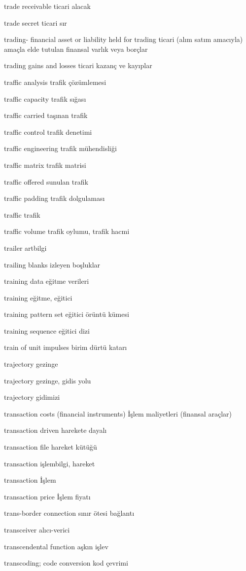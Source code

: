 \documentclass[12pt,fleqn]{article}\usepackage{../../common}
\begin{document}
trade receivable ticari alacak

trade secret ticari sır

trading- financial asset or liability held for trading ticari (alım satım amacıyla) amaçla elde tutulan finansal varlık veya borçlar

trading gains and losses ticari kazanç ve kayıplar

traffic analysis trafik çözümlemesi

traffic capacity trafik sığası

traffic carried taşınan trafik

traffic control trafik denetimi

traffic engineering trafik mühendisliği

traffic matrix trafik matrisi

traffic offered sunulan trafik

traffic padding trafik dolgulaması

traffic trafik

traffic volume trafik oylumu, trafik hacmi

trailer artbilgi

trailing blanks izleyen boşluklar

training data eğitme verileri

training eğitme, eğitici

training pattern set eğitici örüntü kümesi

training sequence eğitici dizi

train of unit impulses birim dürtü katarı

trajectory gezinge

trajectory gezinge, gidis yolu

trajectory gidimizi

transaction costs (financial instruments) İşlem maliyetleri (finansal araçlar)

transaction driven harekete dayalı

transaction file hareket kütüğü

transaction işlembilgi, hareket

transaction İşlem

transaction price İşlem fiyatı

trans-border connection sınır ötesi bağlantı

transceiver alıcı-verici

transcendental function aşkın işlev

transcoding; code conversion kod çevrimi
\end{document}
